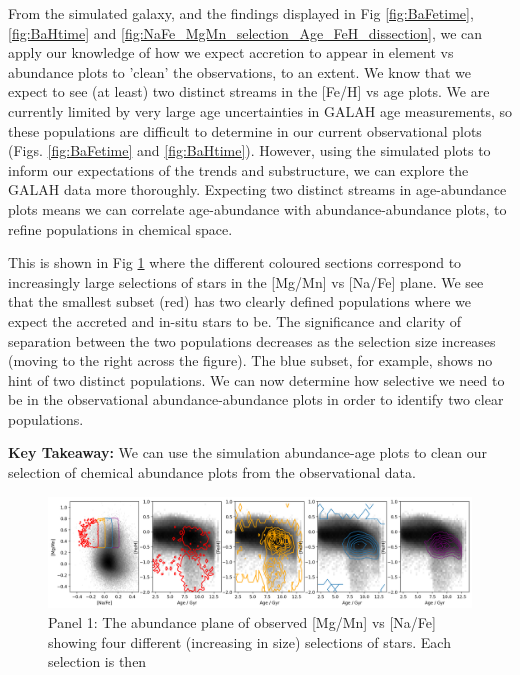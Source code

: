 \documentclass[fleqn,usenatbib]{mnras}
\begin{document}

From the simulated galaxy, and the findings displayed in Fig \ref{fig:BaFetime}, \ref{fig:BaHtime} and \ref{fig:NaFe_MgMn_selection_Age_FeH_dissection}, we can apply our knowledge of how we expect accretion to appear in element vs abundance plots to 'clean' the observations, to an extent. We know that we expect to see (at least) two distinct streams in the [Fe/H] vs age plots. We are currently limited by very large age uncertainties in GALAH age measurements, so these populations are difficult to determine in our current observational plots (Figs. \ref{fig:BaFetime} and \ref{fig:BaHtime}). However, using the simulated plots to inform our expectations of the trends and substructure, we can explore the GALAH data more thoroughly. Expecting two distinct streams in age-abundance plots means we can correlate age-abundance  with abundance-abundance plots, to refine populations in chemical space. \par 
This is shown in Fig \ref{fig:NaFe_MgMn_selection_Age_FeH} where the different coloured sections correspond to increasingly large selections of stars in the [Mg/Mn] vs [Na/Fe] plane. We see that the smallest subset (red) has two clearly defined populations where we expect the accreted and in-situ stars to be. The significance and clarity of separation between the two populations decreases as the selection size increases (moving to the right across the figure). The blue subset, for example, shows no hint of two distinct populations. We can now determine how selective we need to be in the observational abundance-abundance plots in order to identify two clear populations. \par 
\textbf{Key Takeaway:} We can use the simulation abundance-age plots to clean our selection of chemical abundance plots from the observational data. 


\begin{figure}
	\includegraphics[width=\textwidth]{figures/NaFe_MgMn_selection_Age_FeH.png}
    \caption{Panel 1: The abundance plane of observed [Mg/Mn] vs [Na/Fe] showing four different (increasing in size) selections of stars. Each selection is then }
    \label{fig:NaFe_MgMn_selection_Age_FeH}
\end{figure}
\end{document}
